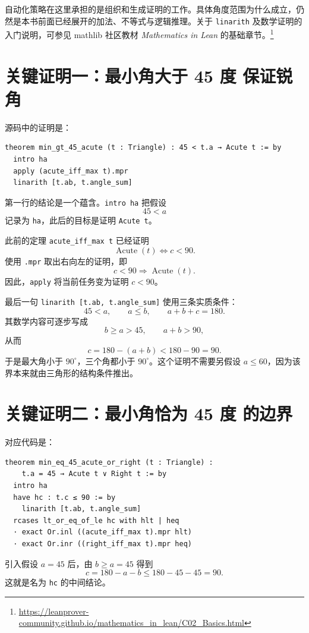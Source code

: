 \documentclass[UTF8,a4paper,zihao=-4,oneside,openany,fontset=fandol]{ctexbook}
\theoremstyle{definition}
\theoremstyle{remark}
\begin{document}
自动化策略在这里承担的是组织和生成证明的工作。具体角度范围为什么成立，仍然是本书前面已经展开的加法、不等式与逻辑推理。关于 \texttt{linarith} 及数学证明的入门说明，可参见 mathlib 社区教材 \emph{Mathematics in Lean} 的基础章节。\footnote{\url{https://leanprover-community.github.io/mathematics_in_lean/C02_Basics.html}}

\section{关键证明一：最小角大于 45 度 保证锐角}

源码中的证明是：
\begin{Verbatim}[fontsize=\small,breaklines=true]
theorem min_gt_45_acute (t : Triangle) : 45 < t.a → Acute t := by
  intro ha
  apply (acute_iff_max t).mpr
  linarith [t.ab, t.angle_sum]
\end{Verbatim}

第一行的结论是一个蕴含。\texttt{intro ha} 把假设
\[
45<a
\]
记录为 \texttt{ha}，此后的目标是证明 \texttt{Acute t}。

此前的定理 \texttt{acute\_iff\_max t} 已经证明
\[
\operatorname{Acute}(t)\Longleftrightarrow c<90.
\]
使用 \texttt{.mpr} 取出右向左的证明，即
\[
c<90\Longrightarrow\operatorname{Acute}(t).
\]
因此，\texttt{apply} 将当前任务变为证明 $c<90$。

最后一句 \texttt{linarith [t.ab, t.angle\_sum]} 使用三条实质条件：
\[
45<a,\qquad a\le b,\qquad a+b+c=180.
\]
其数学内容可逐步写成
\[
b\ge a>45,\qquad a+b>90,
\]
从而
\[
c=180-(a+b)<180-90=90.
\]
于是最大角小于 $90^\circ$，三个角都小于 $90^\circ$。这个证明不需要另假设 $a\le60$，因为该界本来就由三角形的结构条件推出。

\section{关键证明二：最小角恰为 45 度 的边界}

对应代码是：
\begin{Verbatim}[fontsize=\small,breaklines=true]
theorem min_eq_45_acute_or_right (t : Triangle) :
    t.a = 45 → Acute t ∨ Right t := by
  intro ha
  have hc : t.c ≤ 90 := by
    linarith [t.ab, t.angle_sum]
  rcases lt_or_eq_of_le hc with hlt | heq
  · exact Or.inl ((acute_iff_max t).mpr hlt)
  · exact Or.inr ((right_iff_max t).mpr heq)
\end{Verbatim}

引入假设 $a=45$ 后，由 $b\ge a=45$ 得到
\[
c=180-a-b\le180-45-45=90.
\]
这就是名为 \texttt{hc} 的中间结论。
\end{document}
